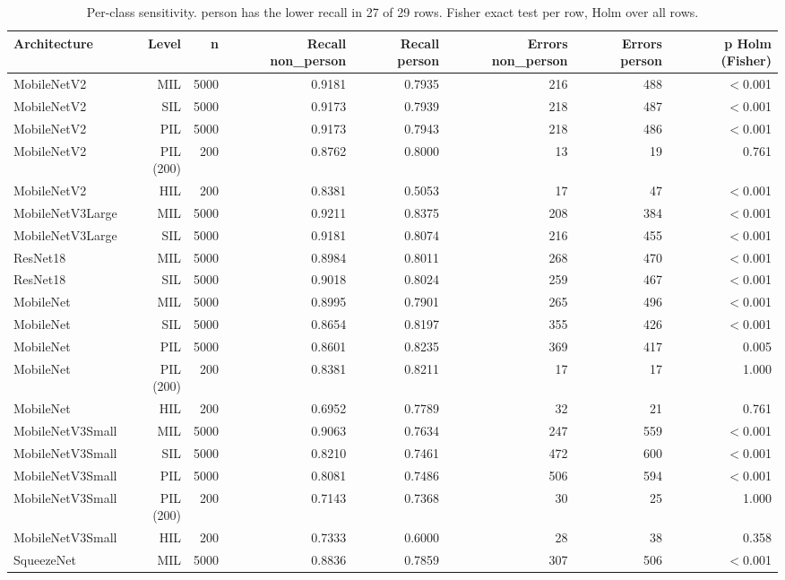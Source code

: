 \begin{table}[htbp]
\centering
\scriptsize
\caption{Per-class sensitivity. person has the lower recall in 27 of 29 rows. Fisher exact test per row, Holm over all rows.}
\label{tab:ladder-coco-5}
\begin{tabular}{lrrrrrrr}
\toprule
Architecture & Level & n & Recall non\_person & Recall person & Errors non\_person & Errors person & p Holm (Fisher) \\
\midrule
MobileNetV2 & MIL & 5000 & 0.9181 & 0.7935 & 216 & 488 & $<$0.001 \\
MobileNetV2 & SIL & 5000 & 0.9173 & 0.7939 & 218 & 487 & $<$0.001 \\
MobileNetV2 & PIL & 5000 & 0.9173 & 0.7943 & 218 & 486 & $<$0.001 \\
MobileNetV2 & PIL (200) & 200 & 0.8762 & 0.8000 & 13 & 19 & 0.761 \\
MobileNetV2 & HIL & 200 & 0.8381 & 0.5053 & 17 & 47 & $<$0.001 \\
MobileNetV3Large & MIL & 5000 & 0.9211 & 0.8375 & 208 & 384 & $<$0.001 \\
MobileNetV3Large & SIL & 5000 & 0.9181 & 0.8074 & 216 & 455 & $<$0.001 \\
ResNet18 & MIL & 5000 & 0.8984 & 0.8011 & 268 & 470 & $<$0.001 \\
ResNet18 & SIL & 5000 & 0.9018 & 0.8024 & 259 & 467 & $<$0.001 \\
MobileNet & MIL & 5000 & 0.8995 & 0.7901 & 265 & 496 & $<$0.001 \\
MobileNet & SIL & 5000 & 0.8654 & 0.8197 & 355 & 426 & $<$0.001 \\
MobileNet & PIL & 5000 & 0.8601 & 0.8235 & 369 & 417 & 0.005 \\
MobileNet & PIL (200) & 200 & 0.8381 & 0.8211 & 17 & 17 & 1.000 \\
MobileNet & HIL & 200 & 0.6952 & 0.7789 & 32 & 21 & 0.761 \\
MobileNetV3Small & MIL & 5000 & 0.9063 & 0.7634 & 247 & 559 & $<$0.001 \\
MobileNetV3Small & SIL & 5000 & 0.8210 & 0.7461 & 472 & 600 & $<$0.001 \\
MobileNetV3Small & PIL & 5000 & 0.8081 & 0.7486 & 506 & 594 & $<$0.001 \\
MobileNetV3Small & PIL (200) & 200 & 0.7143 & 0.7368 & 30 & 25 & 1.000 \\
MobileNetV3Small & HIL & 200 & 0.7333 & 0.6000 & 28 & 38 & 0.358 \\
SqueezeNet & MIL & 5000 & 0.8836 & 0.7859 & 307 & 506 & $<$0.001 \\

\end{tabular}
\end{table}

